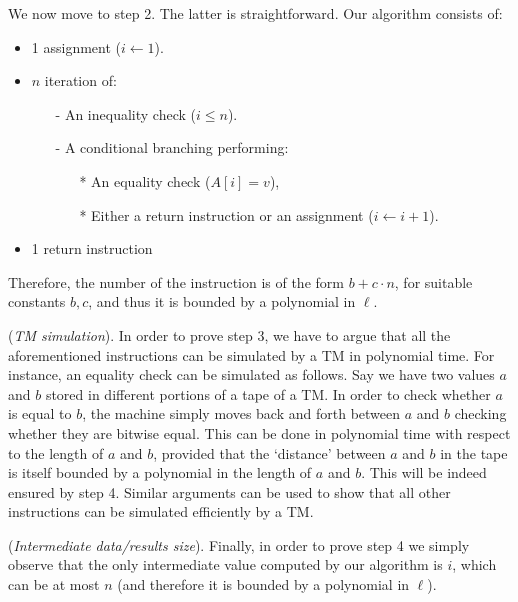 We now move to step 2. The latter is straightforward. Our algorithm consists of:
\begin{itemize}[noitemsep,topsep=0pt,parsep=0pt,partopsep=0pt]
	\item 1 assignment ($i \leftarrow 1$).
	\item $n$ iteration of:
	      \begin{itemize}[noitemsep,topsep=0pt,parsep=0pt,partopsep=0pt]
		      \item[-] An inequality check ($i \leq n$).
		      \item[-] A conditional branching performing:
		            \begin{itemize}[noitemsep,topsep=0pt,parsep=0pt,partopsep=0pt]
			            \item[*] An equality check ($A[i] = v$),
			            \item[*] Either a return instruction or an assignment ($i \leftarrow i + 1$).
		            \end{itemize}
	      \end{itemize}
	\item 1 return instruction
\end{itemize}
Therefore, the number of the instruction is of the form $b + c \cdot n$, for suitable constants $b,c$, and thus it is bounded by a polynomial in $\ell$.

(\emph{TM simulation}).
In order to prove step 3, we have to argue that all the aforementioned instructions can be simulated by a TM in polynomial time. For instance, an equality check can be simulated as follows. Say we have two values $a$ and $b$ stored in different portions of a tape of a TM. In order to check whether $a$ is equal to $b$, the machine simply moves back and forth between $a$ and $b$ checking whether they are bitwise equal. This can be done in polynomial time with respect to the length of $a$ and $b$, provided that the `distance' between $a$ and $b$ in the tape is itself bounded by a polynomial in the length of $a$ and $b$. This will be indeed ensured by step 4. Similar arguments can be used to show that all other instructions can be simulated efficiently by a TM.

(\emph{Intermediate data/results size}).
Finally, in order to prove step 4 we simply observe that the only intermediate value computed by our algorithm is $i$, which can be at most $n$ (and therefore it is bounded by a polynomial in $\ell$).

